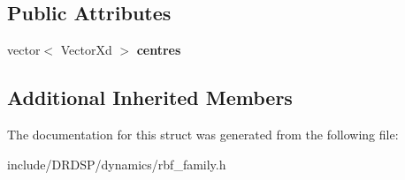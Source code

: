 \subsection*{Public Attributes}
\begin{DoxyCompactItemize}
\item 
\hypertarget{struct_d_r_d_s_p_1_1_r_b_f_family_ae897794ec59bb27cd5de28387912eeff}{vector$<$ Vector\-Xd $>$ {\bfseries centres}}\label{struct_d_r_d_s_p_1_1_r_b_f_family_ae897794ec59bb27cd5de28387912eeff}

\end{DoxyCompactItemize}
\subsection*{Additional Inherited Members}


The documentation for this struct was generated from the following file\-:\begin{DoxyCompactItemize}
\item 
include/\-D\-R\-D\-S\-P/dynamics/rbf\-\_\-family.\-h\end{DoxyCompactItemize}
